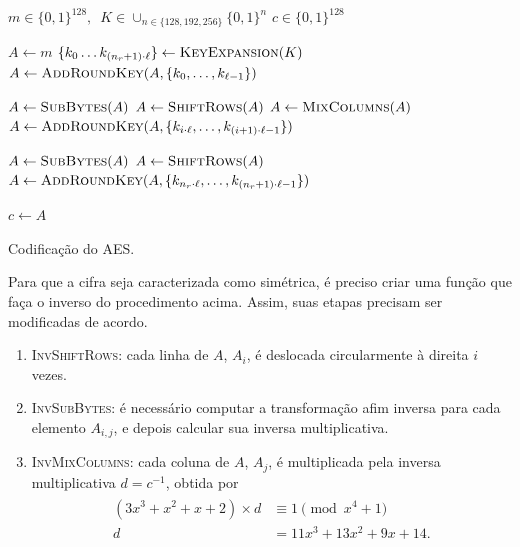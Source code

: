 \documentclass{ufsctex/ufsctex}
\newcommand{\binwds}[1]{\{0, 1\}^{#1}}
\begin{document}
\begin{algorithm}
  \begin{algorithmic}
    \REQUIRE{}  $m \in \binwds{128}, \enspace
      K \in \cup_{n \in \{128, 192, 256\}} \binwds{n}$
    \ENSURE{}  $c \in \binwds{128}$ 

    \STATE{}  $A \leftarrow m$
    \STATE{}  $\{k_{0} \dots k_{(n_{r} + 1) \cdot \ell}\}
      \leftarrow \textsc{KeyExpansion}(K)$
    \STATE{}  $A \leftarrow \textsc{AddRoundKey}(A,
      \{k_{0}, \dots, k_{\ell - 1}\})$

      \STATE{}  $A \leftarrow \textsc{SubBytes}(A)$
      \STATE{}  $A \leftarrow \textsc{ShiftRows}(A)$
      \STATE{}  $A \leftarrow \textsc{MixColumns}(A)$
      \STATE{}  $A \leftarrow \textsc{AddRoundKey}(A,
        \{k_{i \cdot \ell}, \dots, k_{(i + 1) \cdot \ell - 1}\})$
    \ENDFOR{}

    \STATE{}  $A \leftarrow \textsc{SubBytes}(A)$
    \STATE{}  $A \leftarrow \textsc{ShiftRows}(A)$
    \STATE{}  $A \leftarrow \textsc{AddRoundKey}(A,
      \{k_{n_{r} \cdot \ell}, \dots, k_{(n_{r} + 1) \cdot \ell - 1}\})$

    \STATE{}  $c \leftarrow A$
  \end{algorithmic}
  \caption{Codificação do AES.}\label{alg:aesencrypt}
\end{algorithm}

Para que a cifra seja caracterizada como simétrica, é preciso criar uma função
que faça o inverso do procedimento acima. Assim, suas etapas precisam ser
modificadas de acordo.

\begin{enumerate}[label=\roman*.]

  \item \textsc{InvShiftRows}: cada linha de $A$, $A_{i}$, é deslocada
      circularmente à direita $i$ vezes.

  \item \textsc{InvSubBytes}: é necessário computar a transformação afim
      inversa para cada elemento $A_{i, j}$, e depois calcular sua inversa
        multiplicativa.

  \item \textsc{InvMixColumns}: cada coluna de $A$, $A_{j}$, é multiplicada pela
      inversa multiplicativa $d = c^{-1}$, obtida por
        \begin{align}
          \begin{split}
            (3 x^{3} + x^{2} + x + 2) \times d &\equiv 1 \pmod{x^{4} + 1} \\
            d &= 11 x^{3} + 13 x^{2} + 9 x + 14.
          \end{split}
        \end{align}

\end{enumerate}
\end{document}
